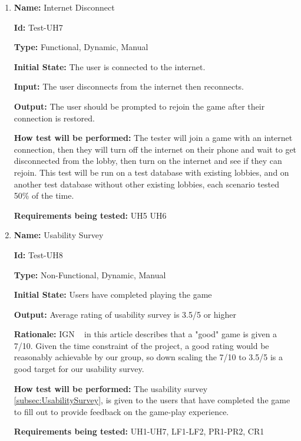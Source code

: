 \documentclass[12pt, titlepage]{article}
\begin{document}
\begin{enumerate}
					


\item{\textbf{Name: }Internet Disconnect } \label{itm:Test-UH7}

\textbf{Id:} Test-UH7

\textbf{Type:} Functional, Dynamic, Manual
					
\textbf{Initial State:} The user is connected to the internet.
					
\textbf{Input:} The user disconnects from the internet then reconnects.
					
\textbf{Output:} The user should be prompted to rejoin the game after their connection is restored.
					
\textbf{How test will be performed:} The tester will join a game with an internet connection, then they will turn off the internet on their phone and wait to get disconnected from the lobby, then turn on the internet and see if they can rejoin. This test will be run on a test database with existing lobbies, and on another test database without other existing lobbies, each scenario tested 50\% of the time.

\textbf{Requirements being tested:} UH5 UH6

\item{\textbf{Name: }Usability Survey } \label{itm:Test-UH8}

\textbf{Id:} Test-UH8

\textbf{Type:} Non-Functional, Dynamic, Manual
					
\textbf{Initial State:} Users have completed playing the game

\textbf{Output:} Average rating of usability survey is 3.5/5 or higher

\textbf{Rationale:} IGN ~\citep{IGNGameScoring} in this article describes that a "good" game is given a 7/10. Given the time constraint of the project, a good rating would be reasonably achievable by our group, so down scaling the 7/10 to 3.5/5 is a good target for our usability survey. 

\textbf{How test will be performed:}  The usability survey \ref{subsec:UsabilitySurvey}, is given to the users that have completed the game to fill out to provide feedback on the game-play experience.

\textbf{Requirements being tested:} UH1-UH7, LF1-LF2, PR1-PR2, CR1

\end{enumerate}
\end{document}
